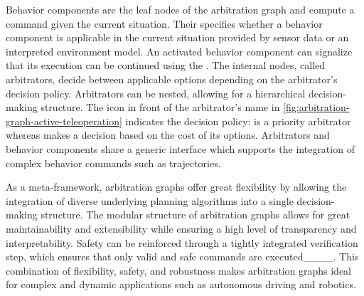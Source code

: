 Behavior components are the leaf nodes of the arbitration graph and compute a command given the current situation.
Their  specifies whether a behavior component is applicable in the current situation provided by sensor data or an interpreted environment model.
An activated behavior component can signalize that its execution can be continued using the .
The internal nodes, called arbitrators, decide between applicable options depending on the arbitrator's decision policy.
Arbitrators can be nested, allowing for a hierarchical decision-making structure.
The icon in front of the arbitrator's name in \cref{fig:arbitration-graph-active-teleoperation} indicates the decision policy:  is a priority arbitrator whereas  makes a decision based on the cost of its options.
Arbitrators and behavior components share a generic interface which supports the integration of complex behavior commands such as trajectories.

As a meta-framework, arbitration graphs offer great flexibility by allowing the integration of diverse underlying planning algorithms into a single decision-making structure.
The modular structure of arbitration graphs allows for great maintainability and extensibility while ensuring a high level of transparency and interpretability.
Safety can be reinforced through a tightly integrated verification step, which ensures that only valid and safe commands are executed____.
This combination of flexibility, safety, and robustness makes arbitration graphs ideal for complex and dynamic applications such as autonomous driving and robotics.

